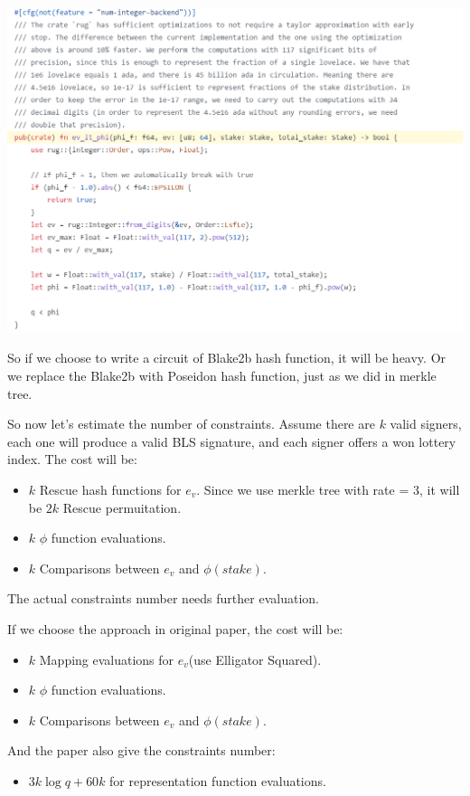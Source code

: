 \documentclass{article}
\begin{document}
\includegraphics[width=1\linewidth]{mithril-phi-code.png}


So if we choose to write a circuit of Blake2b hash function, it will be heavy. Or we replace the Blake2b with Poseidon hash function, just as we did in merkle tree.

So now let's estimate the number of constraints. Assume there are $k$ valid signers, each one will produce a valid BLS signature, and each signer offers a won lottery index.
The cost will be:
\begin{itemize}
    \item $k$ Rescue hash functions for $e_v$. Since we use merkle tree with rate = 3, it will be $2k$ Rescue permuitation.
    \item $k$ $\phi$ function evaluations.
    \item $k$ Comparisons between $e_v$ and $\phi(stake)$.
\end{itemize} 
The actual constraints number needs further evaluation.

If we choose the approach in original paper, the cost will be:

\begin{itemize}
    \item $k$ Mapping evaluations for $e_v$(use Elligator Squared).
    \item $k$ $\phi$ function evaluations.
    \item $k$ Comparisons between $e_v$ and $\phi(stake)$.
\end{itemize}

And the paper also give the constraints number:
\begin{itemize}
    \item $3k\log q + 60k$ for representation function evaluations.
\end{itemize}
\end{document}
